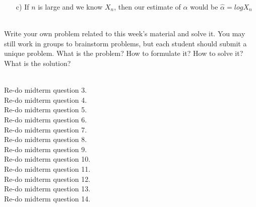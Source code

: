 \documentclass[]{article}
\begin{document}
\begin{qunlist}
{{\begin{itemize}
\[
E(X)=E(\frac{N}{n})=\frac{E(N)}{n}=(1-\frac{1}{n})^{\alpha n}
\]

\[\lim_{n \rightarrow \infty}E(X) = e^{\alpha} \]

\item[c)]
If $n$ is large and we know $X_n$, then our estimate of $\alpha$ would be $\hat{\alpha}=logX_n$


\end{itemize}
}}
\fi
\fi


 \\
Write your own problem related to this week's material and solve it. You may still work in groups to brainstorm problems, but each student should submit a unique problem. What is the problem? How to formulate it? How to solve it? What is the solution?

 \\
Re-do midterm question 3.
 \\
Re-do midterm question 4.
 \\
Re-do midterm question 5.
 \\
Re-do midterm question 6.
 \\
Re-do midterm question 7.
 \\
Re-do midterm question 8.
 \\
Re-do midterm question 9.
 \\
Re-do midterm question 10.
 \\
Re-do midterm question 11.
 \\
Re-do midterm question 12.
 \\
Re-do midterm question 13.
 \\
Re-do midterm question 14.

\end{qunlist}
\end{document}
